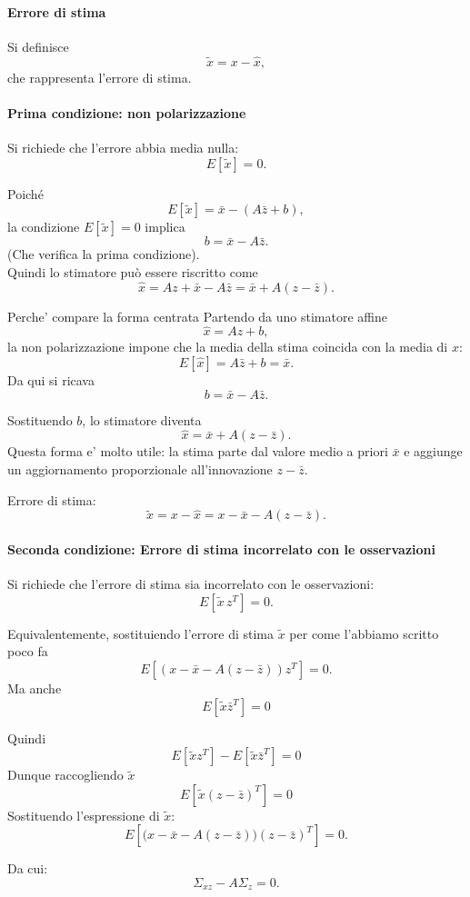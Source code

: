 \documentclass[11pt,a4paper]{article}
\begin{document}
\paragraph{Errore di stima}
Si definisce
\[
\tilde x = x-\hat x,
\]
che rappresenta l'errore di stima.

\paragraph{Prima condizione: non polarizzazione}
Si richiede che l'errore abbia media nulla:
\[
E[\tilde x]=0.
\]

Poiché
\[
E[\tilde x]
=
\bar x-(A\bar z+b),
\]
la condizione \(E[\tilde x]=0\) implica
\[
b=\bar x-A\bar z.
\]
(Che verifica la prima condizione). \\
Quindi lo stimatore può essere riscritto come
\[
\hat x
=
Az+\bar x-A\bar z
=
\bar x + A(z-\bar z).
\]

\begin{spiegazione}{Perche' compare la forma centrata}
Partendo da uno stimatore affine
\[
\hat x=Az+b,
\]
la non polarizzazione impone che la media della stima coincida con la media di $x$:
\[
E[\hat x]=A\bar z+b=\bar x.
\]
Da qui si ricava
\[
b=\bar x-A\bar z.
\]

Sostituendo $b$, lo stimatore diventa
\[
\hat x=\bar x+A(z-\bar z).
\]
Questa forma e' molto utile: la stima parte dal valore medio a priori $\bar x$ e aggiunge un aggiornamento proporzionale all'innovazione $z-\bar z$.
\end{spiegazione}

Errore di stima:
\[
\tilde x
=
x-\hat x
=
x-\bar x-A(z-\bar z).
\]

\paragraph{Seconda condizione: Errore di stima incorrelato con le osservazioni}
Si richiede che l'errore di stima sia incorrelato con le osservazioni:
\[
E[\tilde x\,z^T]=0.
\]

Equivalentemente, sostituiendo l'errore di stima $\tilde x$ per come l'abbiamo scritto poco fa
\[
E[(x-\bar x - A(z-\bar z))z^T]=0.
\]
Ma anche
\[
E[\tilde x \bar z^T] = 0
\]

Quindi 
\[
E[\tilde xz^T] - E[\tilde x \bar z^T] = 0
\]
Dunque raccogliendo $\tilde x$
\[
E[\tilde x(z-\bar z)^T] = 0
\]
Sostituendo l'espressione di \(\tilde x\):
\[
E\!\left[
\bigl(x-\bar x-A(z-\bar z)\bigr)(z-\bar z)^T
\right]=0.
\]

Da cui:
\[
\Sigma_{xz}-A\Sigma_z=0.
\]
\end{document}
